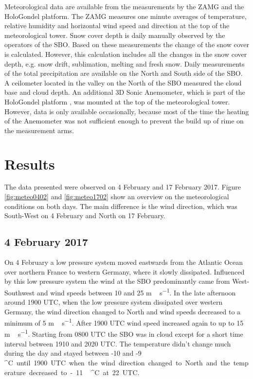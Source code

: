 \documentclass[draft,linenumbers]{agujournal}
\begin{document}

Meteorological data are available from the measurements by the ZAMG and the HoloGondel platform. The ZAMG measures one minute averages of temperature, relative humidity and horizontal wind speed and direction at the top of the meteorological tower. Snow cover depth is daily manually observed by the operators of the SBO. Based on these measurements the change of the snow cover is calculated. However, this calculation includes all the changes in the snow cover depth, e.g. snow drift, sublimation, melting and fresh snow. Daily measurements of the total precipitation are available on the North and South side of the SBO. A ceilometer located in the valley on the North of the SBO measured the cloud base and cloud depth. An additional 3D Sonic Anemometer, which is part of the HoloGondel platform \citep{Bec17}, was mounted at the top of the meteorological tower. However, data is only available occasionally, because most of the time the heating of the Anemometer was not sufficient enough to prevent the build up of rime on the measurement arms. 

\section{Results}
\label{Results}

The data presented were observed on 4 February and 17 February 2017. Figure \ref{fig:meteo0402} and \ref{fig:meteo1702} show an overview on the meteorological conditions on both days. The main difference is the wind direction, which was South-West on 4 February and North on 17 February. 

\subsection{4 February 2017}

On 4 February a low pressure system moved eastwards from the Atlantic Ocean over northern France to western Germany, where it slowly dissipated. Influenced by this low pressure system the wind at the SBO predominantly came from West-Southwest and wind speeds between 10 and 25 \si{m\,s^{-1}}. In the late afternoon around 1900 UTC, when the low pressure system dissipated over western Germany, the wind direction changed to North and wind speeds decreased to a minimum of 5 \si{m\,s^{-1}}. After 1900 UTC wind speed increased again to up to 15 \si{m\,s^{-1}}. Starting from 0800 UTC the SBO was in cloud except for a short time interval between 1910 and 2020 UTC. The temperature didn't change much during the day and stayed between -10 and -9\,\si{^\circ C} until 1900 UTC when the wind direction changed to North and the temperature decreased to -11\,\si{^\circ C} at 22 UTC.
\end{document}
